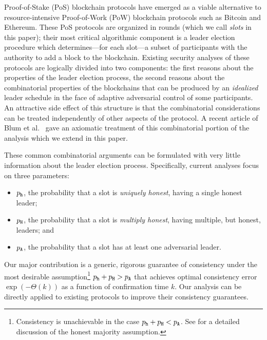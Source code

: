 Proof-of-Stake (PoS) blockchain protocols have emerged as a viable
alternative to resource-intensive Proof-of-Work (PoW) blockchain
protocols such as Bitcoin and Ethereum. These PoS protocols are
organized in rounds (which we call \emph{slots} in this paper); their
most critical algorithmic component is a leader election procedure
which determines---for each slot---a subset of participants with the
authority to add a block to the blockchain. Existing security analyses
of these protocols are logically divided into two components: the
first reasons about the properties of the leader election process, the
second reasons about the combinatorial properties of the blockchains
that can be produced by an \emph{idealized} leader schedule in the
face of adaptive adversarial control of some participants. An
attractive side effect of this structure is that the combinatorial
considerations can be treated independently of other aspects of the
protocol. A recent article of Blum et al.~\cite{LinearConsistency}
gave an axiomatic treatment of this combinatorial portion of the
analysis which we extend in this paper.

These common combinatorial arguments can be formulated with very
little information about the leader election process.  Specifically,
current analyses focus on three parameters:
\begin{itemize}
\item $p_{\mathtt{h}}$, the probability that a slot is \emph{uniquely honest}, having a single honest leader;
\item $p_{\mathtt{H}}$, the probability that a slot is \emph{multiply honest}, having multiple, but honest,
  leaders; and
\item $p_{\mathtt{A}}$, the probability that a slot has at least one adversarial leader.
\end{itemize}
Our major contribution is a generic, rigorous guarantee of consistency
under the most desirable assumption\footnote{ 
  Consistency is unachievable in the case $p_{\mathtt{h}} + p_{\mathtt{H}} < p_{\mathtt{A}}$.
  See \cite{GK18} for a detailed discussion of the honest majority
  assumption. } $p_{\mathtt{h}} + p_{\mathtt{H}} > p_{\mathtt{A}}$ that achieves optimal consistency
error $\exp(-\Theta(k))$ as a function of confirmation time $k$. Our
analysis can be directly applied to existing protocols to improve
their consistency guarantees.

